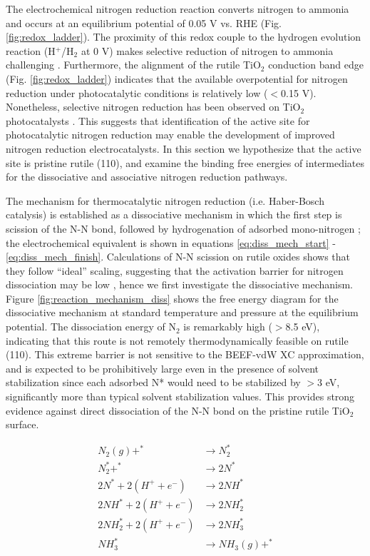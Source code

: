 \documentclass[journal=ascecg,manuscript=article,articletitle=true]{achemso}
\begin{document}
The electrochemical nitrogen reduction reaction converts nitrogen to ammonia and occurs at an equilibrium potential of 0.05 V vs. RHE (Fig. \ref{fig:redox_ladder}). The proximity of this redox couple to the hydrogen evolution reaction (H$^+$/H$_2$ at 0 V) makes selective reduction of nitrogen to ammonia challenging \cite{Skulason_2012, Montoya_2015,Singh_2017}. Furthermore, the alignment of the rutile TiO$_2$ conduction band edge (Fig. \ref{fig:redox_ladder}) indicates that the available overpotential for nitrogen reduction under photocatalytic conditions is relatively low ($<$0.15 V).  Nonetheless, selective nitrogen reduction has been observed on TiO$_2$ photocatalysts \cite{Schrauzer_1977, Schrauzer_1983,Schrauzer_2011,Augugliaro_1982}. This suggests that identification of the active site for photocatalytic nitrogen reduction may enable the development of improved nitrogen reduction electrocatalysts. In this section we hypothesize that the active site is pristine rutile (110), and examine the binding free energies of intermediates for the dissociative and associative nitrogen reduction pathways.

  The mechanism for thermocatalytic nitrogen reduction (i.e. Haber-Bosch catalysis) is established as a dissociative mechanism in which the first step is scission of the N-N bond, followed by hydrogenation of adsorbed mono-nitrogen \cite{Emmett_1933,Ertl_1976,Spencer_1981,Honkala_2005}; the electrochemical equivalent is shown in equations \ref{eq:diss_mech_start} - \ref{eq:diss_mech_finish}. Calculations of N-N scission on rutile oxides shows that they follow ``ideal'' scaling, suggesting that the activation barrier for nitrogen dissociation may be low \cite{Vojvodic_2014}, hence we first investigate the dissociative mechanism. Figure \ref{fig:reaction_mechanism_diss} shows the free energy diagram for the dissociative mechanism at standard temperature and pressure at the equilibrium potential. The dissociation energy of N$_2$ is remarkably high ($>$8.5 eV), indicating that this route is not remotely thermodynamically feasible on rutile (110). This extreme barrier is not sensitive to the BEEF-vdW XC approximation, and is expected to be prohibitively large even in the presence of solvent stabilization since each adsorbed N* would need to be stabilized by $>$3 eV, significantly more than typical solvent stabilization values\cite{Karlberg_2007,He_2017,Hellman2017}. This provides strong evidence against direct dissociation of the N-N bond on the pristine rutile TiO$_2$ surface.
  
\begin{align}
	\label{eq:diss_mech_start}
	N_2(g)+^*  & \rightarrow N_2^{*} \\
    N_2^* + ^*  & \rightarrow 2N^*\\
    2N^* + 2(H^+ + e^-) & \rightarrow 2NH^* \\
    2NH^* + 2(H^+ + e^-) & \rightarrow 2NH_2^* \\
    2NH_2^* + 2(H^+ + e^-) & \rightarrow 2NH_3^* \\
    NH_3^*  & \rightarrow NH_3(g) + ^{*}
    \label{eq:diss_mech_finish}
\end{align}
\end{document}
